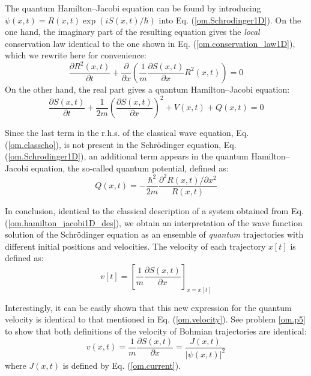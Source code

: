 \documentclass[onecolumn,nofootinbib, secnumarabic, amsmath, nobibnotes,12pt,aps,pra]{revtex4-1}
\newcommand{\eref}[1]{Eq. (\ref{#1})}
\begin{document}
The quantum Hamilton--Jacobi equation can be found by introducing $\psi(x,t) = R(x,t) \exp(i S(x,t)/\hbar)$ into \eref{om.Schrodinger1D}. On the one hand, the imaginary part of the resulting equation gives the \textit{local} conservation law identical to the one shown in \eref{om.conservation_law1D}, which we rewrite here for convenience:
\begin{equation}
\frac{\partial R^2(x,t)}{\partial t} + \frac {\partial } {\partial x} \left(\frac {1} {m} \frac {\partial S(x,t)}{\partial x} R^2(x,t) \right) = 0
\end{equation}
On the other hand, the real part gives a quantum Hamilton--Jacobi equation:
\begin{equation}
\label{om.hamilton_jacobi1D_des}
\frac{\partial S(x,t)}{\partial t} + \frac {1} {2 m} \left(\frac{ \partial S(x,t)} {\partial x} \right)^2 + V(x,t) + Q(x,t) = 0
\end{equation}

Since the last term in the r.h.s. of the classical wave equation, \eref{om.classcho}, is not present in the Schr\"odinger equation, \eref{om.Schrodinger1D}, an additional term appears in the quantum Hamilton--Jacobi equation, the so-called quantum potential, defined as:
\begin{equation}
\label{om.quantum_potential1D}
Q(x,t) = -\frac{\hbar^2} {2 m} \frac{{\partial}^2 R(x,t)/ \partial x^2} {R(x,t)}
\end{equation}

In conclusion, identical to the classical description of a system obtained from \eref{om.hamilton_jacobi1D_des}, we obtain an interpretation of the wave function solution of the Schr\"odinger equation as an ensemble of \textit{quantum} trajectories with different initial positions and velocities.
The velocity of each trajectory $x[t]$ is defined as:
\begin{equation}
\label{om.velocity_dSdx}
v[t] = \left[\frac{1}{m} \frac{\partial S(x,t)}{\partial x}\right]_{x = x[t]}
\end{equation}

Interestingly, it can be easily shown that this new expression for
the quantum velocity is identical to that mentioned in
\eref{om.velocity}. See problem \ref{om.p5} to show that both
definitions of the velocity of Bohmian trajectories are identical:
\begin{equation}
v(x,t) = \frac {1} {m} \frac {\partial S(x,t)} {\partial x} = \frac{J(x,t)} {|\psi(x,t)|^2}
\label{om.velocity2}
\end{equation}
where $J(x,t)$ is defined by \eref{om.current}.
\end{document}

